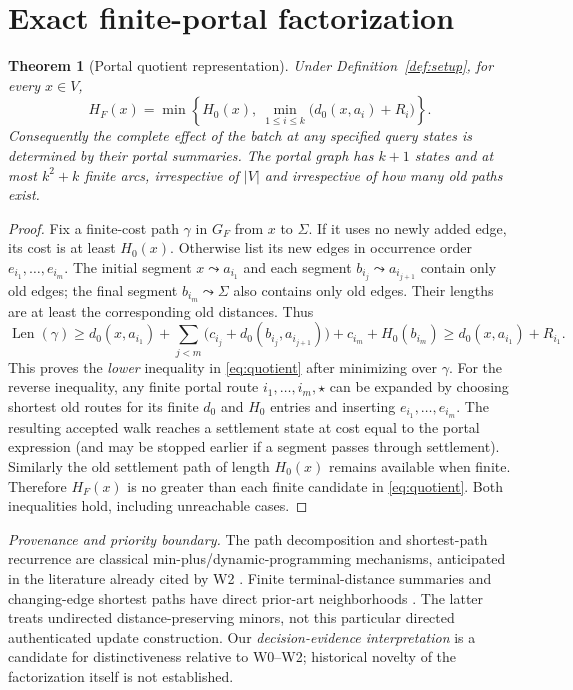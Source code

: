 \documentclass[11pt,letterpaper]{article}
\newtheorem{theorem}{Theorem}[section]
\newcommand{\attrib}[1]{\par\noindent\textit{Provenance and priority boundary.} #1\par}
\begin{document}
\section{Exact finite-portal factorization}
\begin{theorem}[Portal quotient representation]\label{thm:portal}
Under Definition~\ref{def:setup}, for every $x\in V$,
\begin{equation}\label{eq:quotient}
\boxed{\displaystyle H_F(x)=\min\!\left\{H_0(x),\ \min_{1\le i\le k}\bigl(d_0(x,a_i)+R_i\bigr)\right\}.}
\end{equation}
Consequently the complete effect of the batch at any specified query states is determined by their portal summaries. The portal graph has $k+1$ states and at most $k^2+k$ finite arcs, irrespective of $|V|$ and irrespective of how many old paths exist.
\end{theorem}
\begin{proof}
Fix a finite-cost path $\gamma$ in $G_F$ from $x$ to $\Sigma$. If it uses no newly added edge, its cost is at least $H_0(x)$. Otherwise list its new edges in occurrence order $e_{i_1},\ldots,e_{i_m}$. The initial segment $x\leadsto a_{i_1}$ and each segment $b_{i_j}\leadsto a_{i_{j+1}}$ contain only old edges; the final segment $b_{i_m}\leadsto\Sigma$ also contains only old edges. Their lengths are at least the corresponding old distances. Thus
\[
\operatorname{Len}(\gamma)\ge d_0(x,a_{i_1})+\sum_{j<m} \bigl(c_{i_j}+d_0(b_{i_j},a_{i_{j+1}})\bigr)+c_{i_m}+H_0(b_{i_m})
\ge d_0(x,a_{i_1})+R_{i_1}.
\]
This proves the \emph{lower} inequality in \eqref{eq:quotient} after minimizing over $\gamma$. For the reverse inequality, any finite portal route $i_1,\ldots,i_m,\star$ can be expanded by choosing shortest old routes for its finite $d_0$ and $H_0$ entries and inserting $e_{i_1},\ldots,e_{i_m}$. The resulting accepted walk reaches a settlement state at cost equal to the portal expression (and may be stopped earlier if a segment passes through settlement). Similarly the old settlement path of length $H_0(x)$ remains available when finite. Therefore $H_F(x)$ is no greater than each finite candidate in \eqref{eq:quotient}. Both inequalities hold, including unreachable cases.
\end{proof}
\attrib{The path decomposition and shortest-path recurrence are classical min-plus/dynamic-programming mechanisms, anticipated in the literature already cited by W2 \cite{Bellman,Mohri,Dynamic}. Finite terminal-distance summaries and changing-edge shortest paths have direct prior-art neighborhoods \cite{Demetrescu,Krauthgamer}. The latter treats undirected distance-preserving minors, not this particular directed authenticated update construction. Our \emph{decision-evidence interpretation} is a candidate for distinctiveness relative to W0--W2; historical novelty of the factorization itself is not established.}
\end{document}
